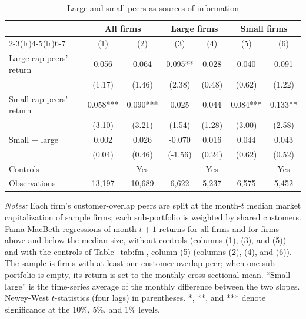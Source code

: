 \begin{table}[!htbp]\centering
\caption{Large and small peers as sources of information}\label{tab:bigsmall}
\footnotesize
\begin{tabular*}{\linewidth}{@{\extracolsep{\fill}}lcccccc}
\toprule
 & \multicolumn{2}{c}{All firms} & \multicolumn{2}{c}{Large firms} & \multicolumn{2}{c}{Small firms} \\
\cmidrule(lr){2-3}\cmidrule(lr){4-5}\cmidrule(lr){6-7}
 & (1) & (2) & (3) & (4) & (5) & (6) \\
\midrule
Large-cap peers' return & 0.056 & 0.064 & 0.095** & 0.028 & 0.040 & 0.091 \\
 & (1.17) & (1.46) & (2.38) & (0.48) & (0.62) & (1.22) \\
Small-cap peers' return & 0.058*** & 0.090*** & 0.025 & 0.044 & 0.084*** & 0.133** \\
 & (3.10) & (3.21) & (1.54) & (1.28) & (3.00) & (2.58) \\
\addlinespace
Small $-$ large & 0.002 & 0.026 & -0.070 & 0.016 & 0.044 & 0.043 \\
 & (0.04) & (0.46) & (-1.56) & (0.24) & (0.62) & (0.52) \\
\addlinespace
Controls &  & Yes &  & Yes &  & Yes \\
Observations & 13,197 & 10,689 & 6,622 & 5,237 & 6,575 & 5,452 \\
\bottomrule
\end{tabular*}
\par\vspace{4pt}\begin{minipage}{\linewidth}\scriptsize \emph{Notes:} Each firm's customer-overlap peers are split at the month-$t$ median market capitalization of sample firms; each sub-portfolio is weighted by shared customers. Fama-MacBeth regressions of month-$t+1$ returns for all firms and for firms above and below the median size, without controls (columns (1), (3), and (5)) and with the controls of Table~\ref{tab:fm}, column (5) (columns (2), (4), and (6)). The sample is firms with at least one customer-overlap peer; when one sub-portfolio is empty, its return is set to the monthly cross-sectional mean. ``Small $-$ large'' is the time-series average of the monthly difference between the two slopes. Newey-West $t$-statistics (four lags) in parentheses. *, **, and *** denote significance at the 10\%, 5\%, and 1\% levels.\end{minipage}
\end{table}